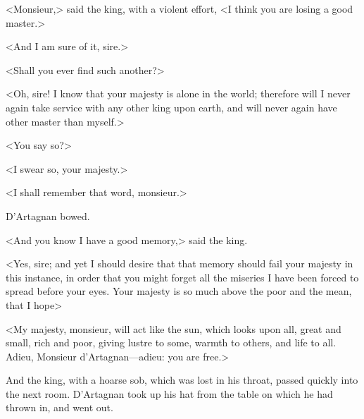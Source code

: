 <Monsieur,> said the king, with a violent effort, <I think you are losing a good master.>

<And I am sure of it, sire.>

<Shall you ever find such another?>

<Oh, sire! I know that your majesty is alone in the world; therefore will I never again take service with any other king upon earth, and will never again have other master than myself.>

<You say so?>

<I swear so, your majesty.>

<I shall remember that word, monsieur.>

D'Artagnan bowed.

<And you know I have a good memory,> said the king.

<Yes, sire; and yet I should desire that that memory should fail your majesty in this instance, in order that you might forget all the miseries I have been forced to spread before your eyes. Your majesty is so much above the poor and the mean, that I hope\longdash>

<My majesty, monsieur, will act like the sun, which looks upon all, great and small, rich and poor, giving lustre to some, warmth to others, and life to all. Adieu, Monsieur d'Artagnan—adieu: you are free.>

And the king, with a hoarse sob, which was lost in his throat, passed quickly into the next room. D'Artagnan took up his hat from the table on which he had thrown in, and went out. 